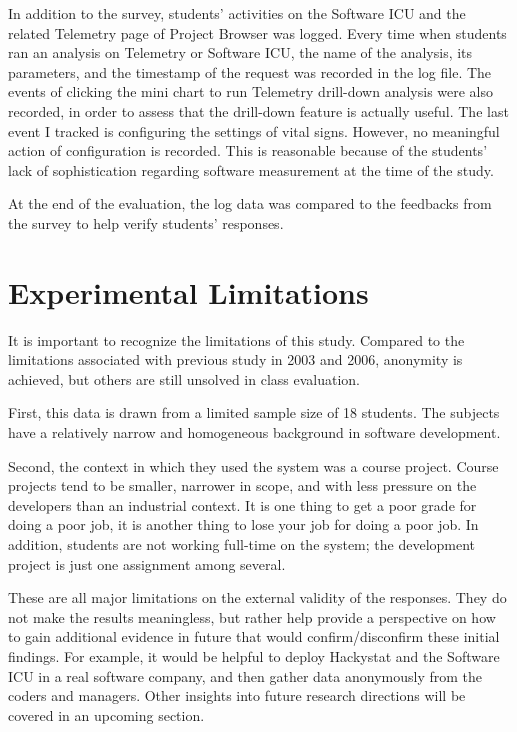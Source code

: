 In addition to the survey, students' activities on the Software ICU and the related Telemetry page of Project Browser was logged. Every time when students ran an analysis on Telemetry or Software ICU, the name of the analysis, its parameters, and the timestamp of the request was recorded in the log file. The events of clicking the mini chart to run Telemetry drill-down analysis were also recorded, in order to assess that the drill-down feature is actually useful. The last event I tracked is configuring the settings of vital signs. However, no meaningful action of configuration is recorded. This is reasonable because of the students' lack of sophistication regarding software measurement at the time of the study.

At the end of the evaluation, the log data was compared to the feedbacks from the survey to help verify students' responses.

\section {Experimental Limitations}

It is important to recognize the limitations of this study. Compared to the limitations associated with previous study in 2003 and 2006, anonymity is achieved, but others are still unsolved in class evaluation.

First, this data is drawn from a limited sample size of 18 students. The subjects have a relatively narrow and homogeneous background in software development.

Second, the context in which they used the system was a course project.  Course projects tend to be smaller, narrower in scope, and with less pressure on the developers than an industrial context.  It is one thing to get a poor grade for doing a poor job, it is another thing to lose your job for doing a poor job.  In addition, students are not working full-time on the system; the development project is just one assignment among several.  

These are all major limitations on the external validity of the responses.  They do not make the results meaningless, but rather help provide a perspective on how to gain additional evidence in future that would confirm/disconfirm these initial findings.  For example, it would be helpful to deploy Hackystat and the Software ICU in a real software company, and then gather data anonymously from the coders and managers. Other insights into future research directions will be covered in an upcoming section.

